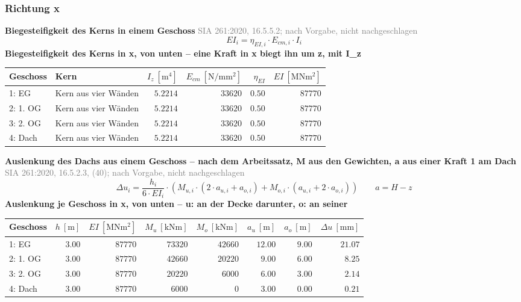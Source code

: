 \documentclass[11pt,a4paper]{article}
\newcommand{\normref}[1]{{\small\textcolor{gray}{#1}}}
\begin{document}
\subsubsection{Richtung x}
\noindent\textbf{Biegesteifigkeit des Kerns in einem Geschoss} \hfill \normref{SIA 261:2020, 16.5.5.2; nach Vorgabe, nicht nachgeschlagen}
\begin{equation*}
EI_i = \eta_{EI,i} \cdot E_{cm,i} \cdot I_i
\end{equation*}
\noindent\textbf{Biegesteifigkeit des Kerns in x, von unten – eine Kraft in x biegt ihn um z, mit I\_z}
\begin{longtable}{llrrrr}
\hline
Geschoss & Kern & $I_z\ [\mathrm{m}^4]$ & $E_{cm}\ [\mathrm{N/mm^2}]$ & $\eta_{EI}$ & $EI\ [\mathrm{MNm^2}]$ \\
\hline
\endhead
1: EG & Kern aus vier Wänden & $5.2214$ & $33620$ & $0.50$ & $87770$ \\
2: 1. OG & Kern aus vier Wänden & $5.2214$ & $33620$ & $0.50$ & $87770$ \\
3: 2. OG & Kern aus vier Wänden & $5.2214$ & $33620$ & $0.50$ & $87770$ \\
4: Dach & Kern aus vier Wänden & $5.2214$ & $33620$ & $0.50$ & $87770$ \\
\hline
\end{longtable}
\noindent\textbf{Auslenkung des Dachs aus einem Geschoss – nach dem Arbeitssatz, M aus den Gewichten, a aus einer Kraft 1 am Dach} \hfill \normref{SIA 261:2020, 16.5.2.3, (40); nach Vorgabe, nicht nachgeschlagen}
\begin{equation*}
\Delta u_i = \frac{h_i}{6 \cdot EI_i} \cdot \left(M_{u,i} \cdot (2 \cdot a_{u,i} + a_{o,i}) + M_{o,i} \cdot (a_{u,i} + 2 \cdot a_{o,i})\right) \qquad a = H - z
\end{equation*}
\noindent\textbf{Auslenkung je Geschoss in x, von unten – u: an der Decke darunter, o: an seiner}
\begin{longtable}{lrrrrrrr}
\hline
Geschoss & $h\ [\mathrm{m}]$ & $EI\ [\mathrm{MNm^2}]$ & $M_u\ [\mathrm{kNm}]$ & $M_o\ [\mathrm{kNm}]$ & $a_u\ [\mathrm{m}]$ & $a_o\ [\mathrm{m}]$ & $\Delta u\ [\mathrm{mm}]$ \\
\hline
\endhead
1: EG & $3.00$ & $87770$ & $73320$ & $42660$ & $12.00$ & $9.00$ & $21.07$ \\
2: 1. OG & $3.00$ & $87770$ & $42660$ & $20220$ & $9.00$ & $6.00$ & $8.25$ \\
3: 2. OG & $3.00$ & $87770$ & $20220$ & $6000$ & $6.00$ & $3.00$ & $2.14$ \\
4: Dach & $3.00$ & $87770$ & $6000$ & $0$ & $3.00$ & $0.00$ & $0.21$ \\
\hline
\end{longtable}
\end{document}
